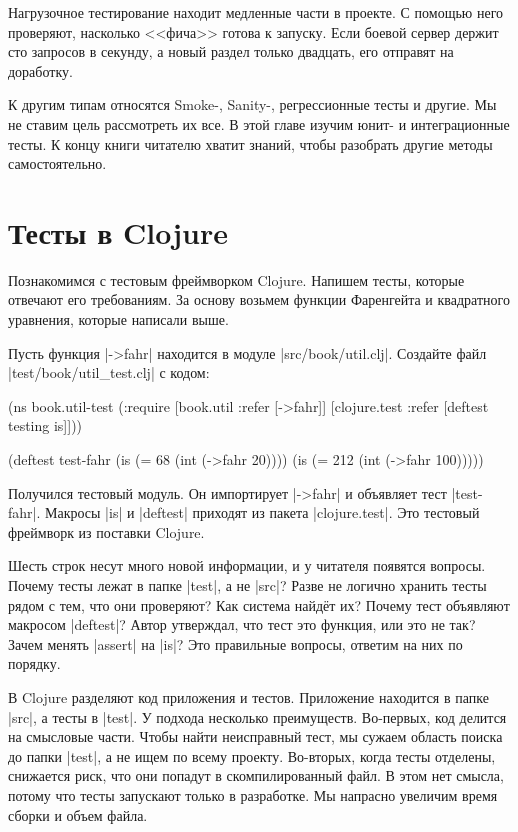 
Нагрузочное тестирование находит медленные части в проекте. С помощью него
проверяют, насколько <<фича>> готова к запуску. Если боевой сервер держит сто
запросов в секунду, а новый раздел только двадцать, его отправят на доработку.

К другим типам относятся Smoke-, Sanity-, регрессионные тесты и другие. Мы не
ставим цель рассмотреть их все. В этой главе изучим юнит- и интеграционные
тесты. К концу книги читателю хватит знаний, чтобы разобрать другие методы
самостоятельно.

\section{Тесты в Clojure}

Познакомимся с тестовым фреймворком Clojure. Напишем тесты, которые отвечают его
требованиям. За основу возьмем функции Фаренгейта и квадратного уравнения,
которые написали выше.

Пусть функция \spverb|->fahr| находится в модуле \spverb|src/book/util.clj|.
Создайте файл \spverb|test/book/util_test.clj| с кодом:


\begin{english}
  \begin{clojure}
(ns book.util-test
  (:require [book.util :refer [->fahr]]
            [clojure.test :refer [deftest testing is]]))

(deftest test-fahr
  (is (= 68 (int (->fahr 20))))
  (is (= 212 (int (->fahr 100)))))
  \end{clojure}
\end{english}

Получился тестовый модуль. Он импортирует \spverb|->fahr| и объявляет тест
\spverb|test-fahr|. Макросы \spverb|is| и \spverb|deftest| приходят из пакета
\spverb|clojure.test|. Это тестовый фреймворк из поставки Clojure.

Шесть строк несут много новой информации, и у читателя появятся вопросы. Почему
тесты лежат в папке \spverb|test|, а не \spverb|src|? Разве не логично хранить
тесты рядом с тем, что они проверяют? Как система найд\"{е}т их?  Почему тест
объявляют макросом \spverb|deftest|? Автор утверждал, что тест это функция, или
это не так? Зачем менять \spverb|assert| на \spverb|is|? Это правильные вопросы,
ответим на них по порядку.

В Clojure разделяют код приложения и тестов. Приложение находится в папке
\spverb|src|, а тесты в \spverb|test|. У подхода несколько
преимуществ. Во-первых, код делится на смысловые части. Чтобы найти неисправный
тест, мы сужаем область поиска до папки \spverb|test|, а не ищем по всему
проекту. Во-вторых, когда тесты отделены, снижается риск, что они попадут в
скомпилированный файл. В этом нет смысла, потому что тесты запускают только в
разработке. Мы напрасно увеличим время сборки и объем файла.

